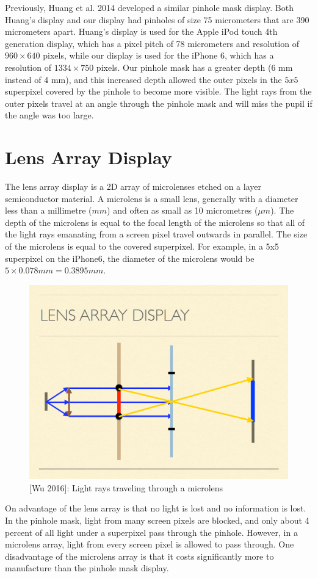Previously, Huang et al. 2014 developed a similar pinhole mask display. Both Huang's display and our display had pinholes of size 75 micrometers that are 390 micrometers apart. Huang's display is used for the Apple iPod touch 4th generation display, which has a pixel pitch of 78 micrometers and resolution of $960 \times 640$ pixels, while our display is used for the iPhone 6, which has a resolution of $1334 \times 750$ pixels. Our pinhole mask has a greater depth (6 mm instead of 4 mm), and this increased depth allowed the outer pixels in the $5x5$ superpixel covered by the pinhole to become more visible. The light rays from the outer pixels travel at an angle through the pinhole mask and will miss the pupil if the angle was too large.


\section{Lens Array Display}

The lens array display is a 2D array of microlenses etched on a layer semiconductor material. A microlens is a small lens, generally with a diameter less than a millimetre ($mm$) and often as small as 10 micrometres ($\mu m$). The depth of the microlens is equal to the focal length of the microlens so that all of the light rays emanating from a screen pixel travel outwards in parallel. The size of the microlens is equal to the covered superpixel. For example, in a 5x5 superpixel on the iPhone6, the diameter of the microlens would be $5 \times 0.078mm = 0.3895mm$.  

\begin{figure}[ht]
  \centering
  \includegraphics[width=5.0in]{chapters/chapter3/images/lens_rays.png}
  \caption{[Wu 2016]: Light rays traveling through a microlens}
  \label{fig:ferrari}
\end{figure}


On advantage of the lens array is that no light is lost and no information is lost. In the pinhole mask, light from many screen pixels are blocked, and only about 4 percent of all light under a superpixel pass through the pinhole. However, in a microlens array, light from every screen pixel is allowed to pass through. One disadvantage of the microlens array is that it costs significantly more to manufacture than the pinhole mask display.

